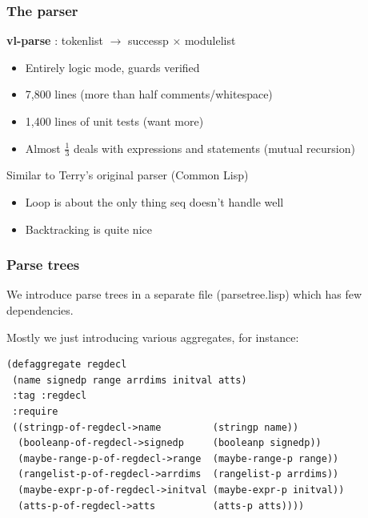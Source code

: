 \documentclass{beamer}
\newcommand{\SmallSkip}{\vspace{0.5cm}\noindent}
\begin{document}
\begin{frame}[fragile]
\frametitle{The parser}

{\bf vl-parse} : tokenlist $\rightarrow$ successp $\times$ modulelist
\begin{itemize}
\item Entirely logic mode, guards verified
\item 7,800 lines (more than half comments/whitespace)
\item 1,400 lines of unit tests (want more)
\item Almost $\frac{1}{3}$ deals with expressions and statements (mutual recursion)
\end{itemize}

\SmallSkip
Similar to Terry's original parser (Common Lisp)
\begin{itemize}
\item Loop is about the only thing seq doesn't handle well
\item Backtracking is quite nice
\end{itemize}



\end{frame}


\begin{frame}[fragile]
\frametitle{Parse trees}

We introduce parse trees in a separate file (parsetree.lisp) which has few
dependencies.

\SmallSkip
Mostly we just introducing various aggregates, for instance:

{\small
\begin{verbatim}
(defaggregate regdecl
 (name signedp range arrdims initval atts)
 :tag :regdecl
 :require
 ((stringp-of-regdecl->name         (stringp name))
  (booleanp-of-regdecl->signedp     (booleanp signedp))
  (maybe-range-p-of-regdecl->range  (maybe-range-p range))
  (rangelist-p-of-regdecl->arrdims  (rangelist-p arrdims))
  (maybe-expr-p-of-regdecl->initval (maybe-expr-p initval))
  (atts-p-of-regdecl->atts          (atts-p atts))))
\end{verbatim}}
\end{frame}
\end{document}
